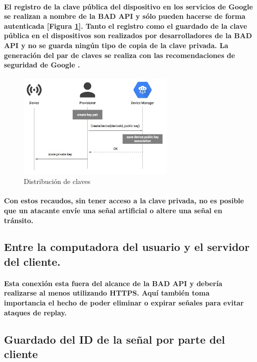 \documentclass{article}
\begin{document}
\paragraph{
El registro de la clave pública del dispositivo en los servicios de Google se realizan a nombre de la BAD API y sólo pueden hacerse de forma autenticada [Figura \ref{fig:keypairgeneration}]. Tanto el registro como el guardado de la clave pública en el dispositivos son realizados por desarrolladores de la BAD API y no se guarda ningún tipo de copia de la clave privada. La generación del par de claves se realiza con las recomendaciones de seguridad de Google \cite{GoogleIotSecurity}.
}

\begin{figure}[ht]
    \centering
    \includegraphics[width=3in]{key-generation.jpeg}%
    \caption{Distribución de claves}
    \label{fig:keypairgeneration}
\end{figure}

\paragraph{
Con estos recaudos, sin tener acceso a la clave privada, no es posible que un atacante envíe una señal artificial o altere una señal en tránsito.
}

\subsection{Entre la computadora del usuario y el servidor del cliente.}
\paragraph{
Esta conexión esta fuera del alcance de la BAD API y debería realizarse al menos utilizando HTTPS. Aquí también toma importancia el hecho de poder eliminar o expirar señales para evitar ataques de replay.
}
\subsection{Guardado del ID de la señal por parte del cliente}
\end{document}
